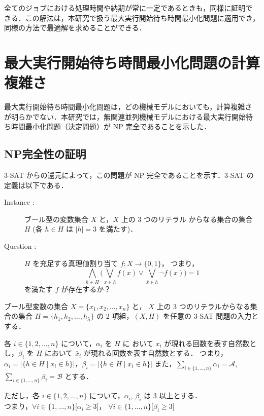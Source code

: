 \documentclass[12pt]{optlab-bachelor}
\begin{document}
全てのジョブにおける処理時間や納期が常に一定であるときも，同様に証明で
きる．この解法は，本研究で扱う最大実行開始待ち時間最小化問題に適用でき，
同様の方法で最適解を求めることができる．

\chapter{最大実行開始待ち時間最小化問題の計算複雑さ}\label{c_4}
最大実行開始待ち時間最小化問題は，どの機械モデルにおいても，計算複雑さ
が明らかでない．本研究では，無関連並列機械モデルにおける最大実行開始待
ち時間最小化問題（決定問題）が NP 完全であることを示した．
\section{NP完全性の証明}
3-SAT からの還元によって，この問題が NP  完全であることを示す．3-SAT
の定義は以下である．

\begin{description}
  \item[Instance : ] ブール型の変数集合 $X$ と，$X$ 上の 3 つのリテラル
  からなる集合の集合 $H$ (各 $h \in H$ は $|h| = 3$ を満たす)．
  \item[Question : ] $H$ を充足する真理値割り当て $f ; X \to \{0,1\}$，
  つまり，
  $$\displaystyle \bigwedge_{h \in H} \bigg(\bigvee_{x \in h}f(x) \lor
  \bigvee_{\bar x \in h}\lnot f(x) \bigg) = 1$$
  を満たす $f$ が存在するか？
\end{description}

ブール型変数の集合 $X =\{x_1, x_2,\ldots ,x_n\}$ と， $X$ 上の 3 つのリテラルからなる集合の集合 $H =\{h_1, h_2,\ldots ,h_{\lambda}\}$ の 2 項組，$(X,H)$ を任意の 3-SAT 問題の入力とする．

各 $i \in \{1,2,\ldots, n\}$ について，$\alpha_i$ を $H$ に おいて $x_i$ が現れる回数を表す自然数とし，$\beta_i$ を $H$ において $\bar x_i$ が現れる回数を表す自然数とする．
つまり，$\alpha_i = \big|\{h \in H \mid x_i \in h\}\big|$，$\beta_i = \big|\{h \in H \mid \bar x_i \in h\}\big|$
また，$\displaystyle \sum_{i \in \{1,\ldots,n\}} \alpha_i = \mathcal{A}$, $\displaystyle \sum_{i \in \{1,\ldots,n\}} \beta_i = \mathcal{B}$  とする．

ただし，各 $i \in \{1,2,\ldots, n\}$ について，$\alpha_i$, $\beta_i$ は 3 以上とする．\\
つまり，$\forall i \in \{1,\ldots,n\}\big[\alpha_i \ge 3\big]$，
$\forall i \in \{1,\ldots,n\}\big[\beta_i \ge 3\big]$
\end{document}
